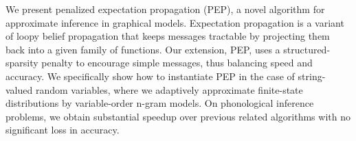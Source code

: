We present penalized expectation propagation (PEP), a novel algorithm for approximate inference in graphical models.  Expectation propagation is a variant of loopy belief propagation that keeps messages tractable by projecting them back into a given family of functions.  Our extension, PEP, uses a structured-sparsity penalty to encourage simple messages, thus balancing speed and accuracy.  We specifically show how to instantiate PEP in the case of string-valued random variables, where we adaptively approximate finite-state distributions by variable-order n-gram models. On phonological inference problems, we obtain substantial speedup over previous related algorithms with no significant loss in accuracy.

